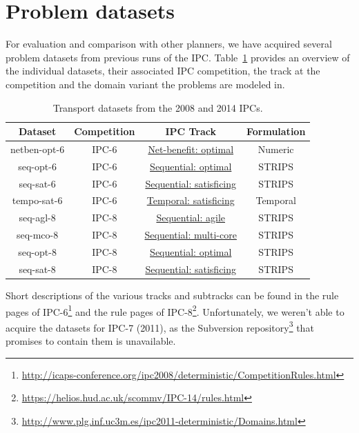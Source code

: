\section{Problem datasets}

For evaluation and comparison with other planners, we have acquired several problem datasets from previous runs of the IPC.
Table~\ref{tab:ipc-datasets} provides an overview of the individual datasets, their associated IPC competition, the track at the competition and the domain variant the problems are modeled in.

\begin{table}[tb]
\begin{tabular}{c||ccc}
\textbf{Dataset} & \textbf{Competition} & \textbf{IPC Track} & \textbf{Formulation} \\ 
\hline
\hline
netben-opt-6 & IPC-6 & \href{http://icaps-conference.org/ipc2008/deterministic/NetBenefitOptimization.html}{Net-benefit: optimal} & Numeric \\ 
seq-opt-6 & IPC-6 & \href{http://icaps-conference.org/ipc2008/deterministic/SequentialOptimization.html}{Sequential: optimal} & STRIPS \\ 
seq-sat-6 & IPC-6 & \href{http://icaps-conference.org/ipc2008/deterministic/SequentialSatisficing.html}{Sequential: satisficing} & STRIPS \\ 
tempo-sat-6 & IPC-6 & \href{http://icaps-conference.org/ipc2008/deterministic/TemporalSatisficing.html}{Temporal: satisficing} & Temporal \\ 
\hline
seq-agl-8 & IPC-8 & \href{https://helios.hud.ac.uk/scommv/IPC-14/seqagi.html}{Sequential: agile} & STRIPS \\ 
seq-mco-8 & IPC-8 & \href{https://helios.hud.ac.uk/scommv/IPC-14/seqmulti.html}{Sequential: multi-core} & STRIPS \\ 
seq-opt-8 & IPC-8 & \href{https://helios.hud.ac.uk/scommv/IPC-14/seqopt.html}{Sequential: optimal} & STRIPS \\ 
seq-sat-8 & IPC-8 & \href{https://helios.hud.ac.uk/scommv/IPC-14/seqsat.html}{Sequential: satisficing} & STRIPS \\ 
\end{tabular}
\caption{Transport datasets from the 2008 and 2014 IPCs.}
\label{tab:ipc-datasets}
\end{table}

Short descriptions of the various tracks and subtracks can be found in the rule pages of IPC-6\footnote{\url{http://icaps-conference.org/ipc2008/deterministic/CompetitionRules.html}}
and the rule pages of IPC-8\footnote{\url{https://helios.hud.ac.uk/scommv/IPC-14/rules.html}}.
Unfortunately, we weren't able to acquire the datasets for IPC-7 (2011), as the Subversion repository\footnote{\url{http://www.plg.inf.uc3m.es/ipc2011-deterministic/Domains.html}} that promises to contain them is unavailable.

